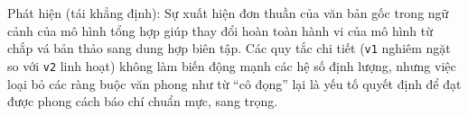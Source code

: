 Phát hiện (tái khẳng định): Sự xuất hiện đơn thuần của văn bản gốc trong ngữ cảnh của mô hình tổng hợp giúp thay đổi hoàn toàn hành vi của mô hình từ chắp vá bản thảo sang dung hợp biên tập. Các quy tắc chi tiết (\texttt{v1} nghiêm ngặt so với \texttt{v2} linh hoạt) không làm biến động mạnh các hệ số định lượng, nhưng việc loại bỏ các ràng buộc văn phong như từ ``cô đọng'' lại là yếu tố quyết định để đạt được phong cách báo chí chuẩn mực, sang trọng.
